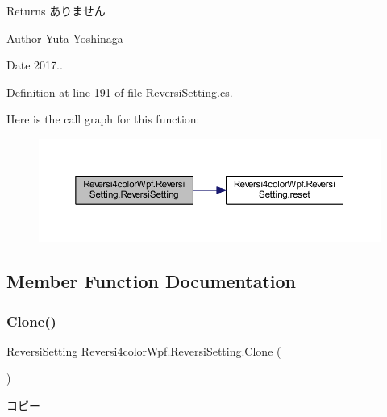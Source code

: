 \begin{DoxyReturn}{Returns}
ありません 
\end{DoxyReturn}
\begin{DoxyAuthor}{Author}
Yuta Yoshinaga 
\end{DoxyAuthor}
\begin{DoxyDate}{Date}
2017.. 
\end{DoxyDate}


Definition at line 191 of file Reversi\+Setting.\+cs.

Here is the call graph for this function\+:
\nopagebreak
\begin{figure}[H]
\begin{center}
\leavevmode
\includegraphics[width=350pt]{class_reversi4color_wpf_1_1_reversi_setting_a630bca61bfcbb2e5683ca09393db79a8_cgraph}
\end{center}
\end{figure}


\subsection{Member Function Documentation}
\mbox{\label{class_reversi4color_wpf_1_1_reversi_setting_a08721b21ad49c264dcd8821ca16d2cdb}} 
\subsubsection{\texorpdfstring{Clone()}{Clone()}}
{\footnotesize\ttfamily \hyperlink{class_reversi4color_wpf_1_1_reversi_setting}{Reversi\+Setting} Reversi4color\+Wpf.\+Reversi\+Setting.\+Clone (\begin{DoxyParamCaption}{ }\end{DoxyParamCaption})}



コピー 

